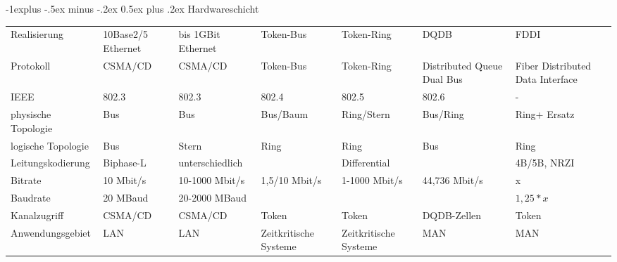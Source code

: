 \documentclass[10pt,landscape]{article}
\makeatletter
\renewcommand{\subsection}{\@startsection{subsection}{2}{0mm}%
                                {-1explus -.5ex minus -.2ex}%
                                {0.5ex plus .2ex}%
                                {\normalfont\normalsize\bfseries}}
\makeatother
\begin{document}
\subsection{Hardwareschicht}
\begin{tabular}{l | l | l | l | l | l | l}
    Realisierung        & 10Base2/5 Ethernet & bis 1GBit Ethernet & Token-Bus             & Token-Ring            & DQDB                       & FDDI                             \\
    Protokoll           & CSMA/CD            & CSMA/CD            & Token-Bus             & Token-Ring            & Distributed Queue Dual Bus & Fiber Distributed Data Interface \\
    IEEE                & 802.3              & 802.3              & 802.4                 & 802.5                 & 802.6                      & -                                \\
    physische Topologie & Bus                & Bus                & Bus/Baum              & Ring/Stern            & Bus/Ring                   & Ring+ Ersatz                     \\
    logische Topologie  & Bus                & Stern              & Ring                  & Ring                  & Bus                        & Ring                             \\
    Leitungskodierung   & Biphase-L          & unterschiedlich    &                       & Differential          &                            & 4B/5B, NRZI                      \\
    Bitrate             & 10 Mbit/s          & 10-1000 Mbit/s     & 1,5/10 Mbit/s         & 1-1000 Mbit/s         & 44,736 Mbit/s              & x                                \\
    Baudrate            & 20 MBaud           & 20-2000 MBaud      &                       &                       &                            & $1,25*x$                         \\
    Kanalzugriff        & CSMA/CD            & CSMA/CD            & Token                 & Token                 & DQDB-Zellen                & Token                            \\
    Anwendungsgebiet    & LAN                & LAN                & Zeitkritische Systeme & Zeitkritische Systeme & MAN                        & MAN                              \\
\end{tabular}
\end{document}
